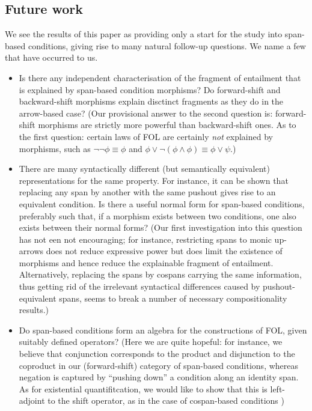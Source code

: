 \subsection{Future work}

We see the results of this paper as providing only a start for the study into span-based conditions, giving rise to many natural follow-up questions. We name a few that have occurred to us.
%
\begin{itemize}
\item Is there any independent characterisation of the fragment of entailment that is explained by span-based condition morphisms? Do forward-shift and backward-shift morphisms explain disctinct fragments as they do in the arrow-based case? (Our provisional answer to the second question is: forward-shift morphisms are strictly more powerful than backward-shift ones. As to the first question: certain laws of FOL are certainly \emph{not} explained by morphisms, such as $\neg\neg\phi\equiv \phi$ and $\phi\vee \neg(\phi\wedge\phi)\equiv \phi\vee\psi$.)

\item There are many syntactically different (but semantically equivalent) representations for the same property. For instance, it can be shown that replacing any span by another with the same pushout gives rise to an equivalent condition. Is there a useful normal form for span-based conditions, preferably such that, if a morphism exists between two conditions, one also exists between their normal forms? (Our first investigation into this question has not een not encouraging; for instance, restricting spans to monic up-arrows does not reduce expressive power but does limit the existence of morphisms and hence reduce the explainable fragment of entailment. Alternatively, replacing the spans by cospans carrying the same information, thus getting rid of the irrelevant syntactical differences caused by pushout-equivalent spans, seems to break a number of necessary compositionality results.)

\item Do span-based conditions form an algebra for the constructions of FOL, given suitably defined operators? (Here we are quite hopeful: for instance, we believe that conjunction corresponds to the product and disjunction to the coproduct in our (forward-shift) category of span-based conditions, whereas negation is captured by ``pushing down'' a condition along an identity span. As for existential quantifitcation, we would like to show that this is left-adjoint to the shift operator, as in the case of cospan-based conditions \cite{Konig})
\end{itemize}
